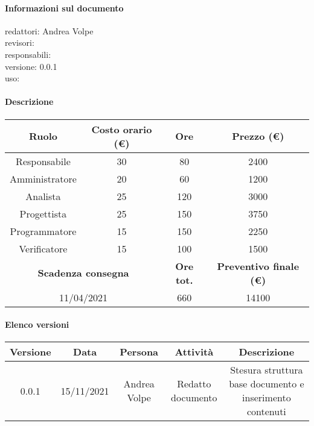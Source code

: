 \documentclass[a4paper,12pt]{article}
\begin{document}
\paragraph{Informazioni sul documento \\}
redattori: Andrea Volpe \\
revisori: \\
responsabili: \\
versione: 0.0.1 \\
uso:

\paragraph{Descrizione \\}
\begin{tabular}{|c|c|c|c|}
    \hline
    \textbf{Ruolo} & \textbf{Costo orario (€)} & \textbf{Ore} & \textbf{Prezzo (€)}\\
    \hline
    Responsabile & 30 & 80 & 2400\\
    \hline
    Amministratore & 20 & 60 & 1200\\
    \hline
    Analista & 25 & 120 & 3000\\
    \hline
    Progettista & 25 & 150 & 3750\\
    \hline
    Programmatore & 15 & 150 & 2250\\
    \hline
    Verificatore & 15 & 100 & 1500\\
    \hline\hline
    \multicolumn{2}{|c|}{\textbf{Scadenza consegna}} & \textbf{Ore tot.} & \textbf{Preventivo finale (€)}\\
    \hline
    \multicolumn{2}{|c|}{11/04/2021} & 660 & 14100\\
    \hline
    \end{tabular}

\paragraph{Elenco versioni \\}
\begin{tabular}{|c|c|c|c|c|}
    \hline
    \textbf{Versione} & \textbf{Data} & \textbf{Persona} & \textbf{Attività} & \textbf{Descrizione}\\
    \hline
    0.0.1 & 15/11/2021 & Andrea Volpe & Redatto documento & Stesura struttura base documento e inserimento contenuti\\
    \hline
    \end{tabular}
\end{document}
